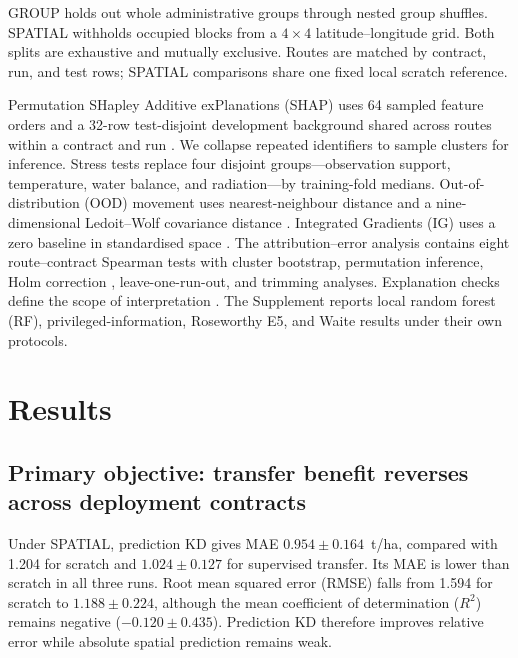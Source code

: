\documentclass[runningheads]{venue/lncs/llncs}
\newcommand{\group}{\textsc{GROUP}}
\newcommand{\spatial}{\textsc{SPATIAL}}
\begin{document}
\group{} holds out whole administrative groups through nested group shuffles. \spatial{} withholds occupied blocks from a $4\times4$ latitude--longitude grid. Both splits are exhaustive and mutually exclusive. Routes are matched by contract, run, and test rows; SPATIAL comparisons share one fixed local scratch reference.

Permutation SHapley Additive exPlanations (SHAP) uses 64 sampled feature orders and a 32-row test-disjoint development background shared across routes within a contract and run \cite{Aas2021DependentSHAP,Lundberg2017SHAP}. We collapse repeated identifiers to sample clusters for inference. Stress tests replace four disjoint groups---observation support, temperature, water balance, and radiation---by training-fold medians. Out-of-distribution (OOD) movement uses nearest-neighbour distance and a nine-dimensional Ledoit--Wolf covariance distance \cite{LedoitWolf2004}. Integrated Gradients (IG) uses a zero baseline in standardised space \cite{Sundararajan2017IntegratedGradients}. The attribution--error analysis contains eight route--contract Spearman tests with cluster bootstrap, permutation inference, Holm correction \cite{Holm1979}, leave-one-run-out, and trimming analyses. Explanation checks define the scope of interpretation \cite{Adebayo2018SanityChecks,Hooker2019ROAR}. The Supplement reports local random forest (RF), privileged-information, Roseworthy E5, and Waite results under their own protocols.

\section{Results}

\subsection{Primary objective: transfer benefit reverses across deployment contracts}

Under \spatial{}, prediction KD gives MAE $0.954\pm0.164$~t/ha, compared with 1.204 for scratch and $1.024\pm0.127$ for supervised transfer. Its MAE is lower than scratch in all three runs. Root mean squared error (RMSE) falls from 1.594 for scratch to $1.188\pm0.224$, although the mean coefficient of determination ($R^2$) remains negative ($-0.120\pm0.435$). Prediction KD therefore improves relative error while absolute spatial prediction remains weak.
\end{document}
